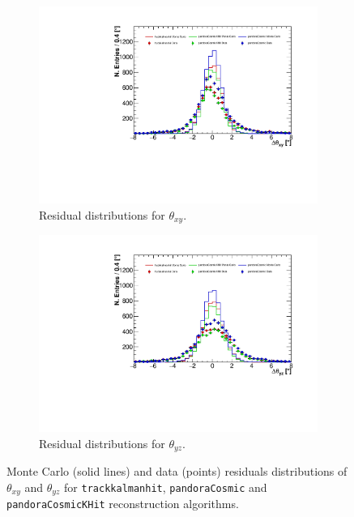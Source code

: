 \documentclass[a4paper]{scrartcl}
\begin{document}
\begin{figure}[htbp]
\begin{subfigure}{0.52\textwidth}
\includegraphics[width=\linewidth]{figures/xy_res.pdf}
\caption{Residual distributions for $\theta_{xy}$.} \label{fig:res_xy}
\end{subfigure}
\hspace*{\fill}
\begin{subfigure}{0.52\textwidth}
\includegraphics[width=\linewidth]{figures/yz_res.pdf}
\caption{Residual distributions for $\theta_{yz}$.} \label{fig:res_yz}
\end{subfigure}
\caption{Monte Carlo (solid lines) and data (points) residuals distributions of $\theta_{xy}$ and $\theta_{yz}$ for \texttt{track\-kal\-man\-hit}, \texttt{pan\-do\-ra\-Co\-smic} and \texttt{pan\-do\-ra\-Co\-smicKHit} reconstruction algorithms.} \label{fig:res}
\end{figure}
\end{document}
